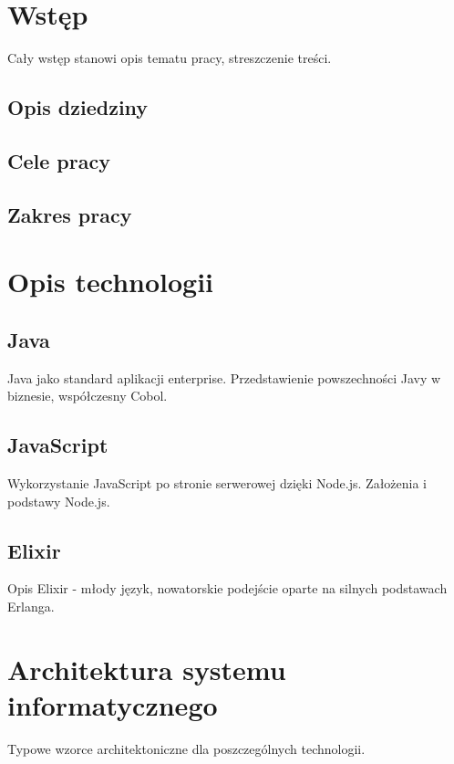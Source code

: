 \section{Wstęp}

Cały wstęp stanowi opis tematu pracy, streszczenie treści.

\subsection{Opis dziedziny}

\subsection{Cele pracy}

\subsection{Zakres pracy}

\section{Opis technologii}

\subsection{Java}

Java jako standard aplikacji enterprise. Przedstawienie powszechności
Javy w biznesie, współczesny Cobol.

\subsection{JavaScript}

Wykorzystanie JavaScript po stronie serwerowej dzięki Node.js. Założenia
i podstawy Node.js.

\subsection{Elixir}

Opis Elixir - młody język, nowatorskie podejście oparte na silnych
podstawach Erlanga.

\section{Architektura systemu
informatycznego}

Typowe wzorce architektoniczne dla poszczególnych technologii.

